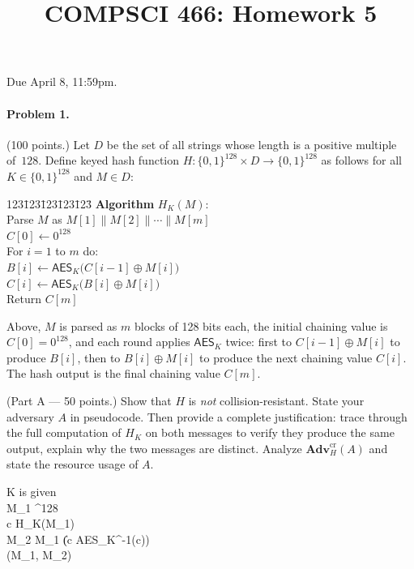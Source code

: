 \documentclass[11pt]{article}
\title{COMPSCI 466: Homework 5}
\date{}
\newcommand{\bits}{\{0,1\}}
\begin{document}
\maketitle
\thispagestyle{fancy}

\noindent Due April 8, 11:59pm.


\paragraph*{Problem 1.} (100 points.)
Let $D$ be the set of all strings whose length is a positive multiple of~$128$.
Define keyed hash function $H \colon \bits^{128} \times D \to \bits^{128}$
as follows for all $K \in \bits^{128}$ and $M \in D$:

\begin{center}
\begin{minipage}{1.5in}
\begin{tabbing}
123\=123\=123\=123\=123\=\kill
\textbf{Algorithm} $H_K(M)$: \\
\> Parse $M$ as $M[1] \| M[2] \| \cdots \| M[m]$ \\
\> $C[0] \gets 0^{128}$ \\
\> For $i = 1$ to $m$ do: \\
\>\> $B[i] \gets \mathsf{AES}_K\!\bigl(C[i-1] \oplus M[i]\bigr)$ \\
\>\> $C[i] \gets \mathsf{AES}_K\!\bigl(B[i]   \oplus M[i]\bigr)$ \\
\> Return $C[m]$
\end{tabbing}
\end{minipage}
\end{center}

\noindent
Above, $M$ is parsed as $m$ blocks of 128 bits each, the initial
chaining value is $C[0] = 0^{128}$, and each round applies
$\mathsf{AES}_K$ twice: first to $C[i-1] \oplus M[i]$ to produce $B[i]$,
then to $B[i] \oplus M[i]$ to produce the next chaining value $C[i]$.
The hash output is the final chaining value $C[m]$.

\medskip

\noindent (Part A --- 50 points.)
Show that $H$ is \emph{not} collision-resistant.
State your adversary $A$ in pseudocode.
Then provide a complete justification: trace through the full computation
of $H_K$ on both messages to verify they produce the same output,
explain why the two messages are distinct.
Analyze $\mathbf{Adv}^{\mathrm{cr}}_H(A)$  and
state the resource usage of $A$.

\begin{algorithm}[H]
\caption{$A_H$}
K is given\\
M_1 ^{128}\\
c \leftarrow H_K(M_1)\\
M_2 \leftarrow M_1 \| (c \oplus AES_K^{-1}(c))\\
\Return (M_1, M_2)
\end{algorithm}
\end{document}
